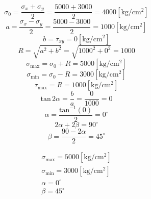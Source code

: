 \documentclass[letter,10pt,twoside]{article}
\begin{document}
\begin{equation*}
    \sigma_0 = \frac{\sigma_x + \sigma_y}{2}
             = \frac{5000 + 3000}{2}
             = 4000[\text{kg}/\text{cm}^2]
\end{equation*}
\begin{equation*}
    a = \frac{\sigma_x - \sigma_y}{2}
      = \frac{5000 - 3000}{2}
      = 1000[\text{kg}/\text{cm}^2]
\end{equation*}
\begin{equation*}
    b = \tau_{xy}
      = 0[\text{kg}/\text{cm}^2]
\end{equation*}
\begin{equation*}
    R = \sqrt{a^2 + b^2}
      = \sqrt{1000^2 + 0^2}
      = 1000
\end{equation*}
\begin{equation*}
    \sigma_{\text{max}} = \sigma_0 + R
                        = 5000[\text{kg}/\text{cm}^2]
\end{equation*}
\begin{equation*}
    \sigma_{\text{min}} = \sigma_0 - R
                        = 3000[\text{kg}/\text{cm}^2]
\end{equation*}
\begin{equation*}
    \tau_{\text{max}} = R
                      = 1000[\text{kg}/\text{cm}^2]
\end{equation*}
\begin{equation*}
    \text{tan}\,2\alpha = \frac{b}{a}
                        = \frac{0}{1000}
                        = 0
\end{equation*}
\begin{equation*}
    \alpha = \frac{\text{tan}^{-1}(0)}{2}
           = 0^\circ
\end{equation*}
\begin{equation*}
    2\alpha + 2\beta = 90^\circ
\end{equation*}
\begin{equation*}
    \beta = \frac{90 - 2\alpha}{2}
          = 45^\circ
\end{equation*}

\begin{equation*}
\boxed{
    \begin{array}{l}
        \sigma_{\text{max}} = 5000[\text{kg}/\text{cm}^2] \\
        \sigma_{\text{min}} = 3000[\text{kg}/\text{cm}^2] \\
        \alpha = 0^\circ \\
        \beta = 45^\circ
    \end{array}
}
\end{equation*}
\end{document}
